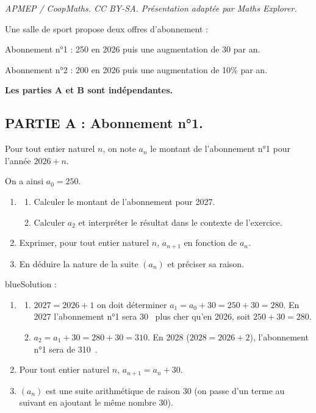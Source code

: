 \documentclass[10pt]{article}
\providecommand{\euro}{\texteuro}
\providecommand{\euro}{{\text{€}}}
\renewcommand{\euro}{\ifmmode\text{\texteuro}\else\texteuro\fi}
\begin{document}
\noindent\textit{APMEP / CoopMaths. CC BY-SA. Présentation adaptée par Maths Explorer.}\par\medskip
Une salle de sport propose deux offres d'abonnement :

Abonnement n°1 : 250 \euro{} en 2026 puis une augmentation de 30 \euro{} par an.

Abonnement n°2 : 200 \euro{} en 2026 puis une augmentation de 10\% par an.

\textbf{Les parties A et B sont indépendantes.}


\subsection*{PARTIE A : Abonnement n°1.}

Pour tout entier naturel $n$, on note $a_n$ le montant de l'abonnement n°1 pour l'année $2026+n$.

On a ainsi $a_0=250$.
\begin{enumerate}
\item
\begin{enumerate}[label=\alph*)]
\item Calculer le montant de l'abonnement pour 2027.
\item Calculer $a_2$ et interpréter le résultat dans le contexte de l'exercice.
\end{enumerate}
\item Exprimer, pour tout entier naturel $n$, $a_{n+1}$ en fonction de $a_n$.
\item En déduire la nature de la suite $(a_n)$ et 
préciser sa raison.
\end{enumerate}

\begin{color}{blue}Solution :\par
\begin{enumerate}
\item
\begin{enumerate}[label=\alph*)]
\item $2027=2026+1$ on doit déterminer $a_{1}=a_{0} + 30 = 250 + 30 = 280$. En 2027 l'abonnement n°1 sera 30~\euro{} plus cher qu'en 2026, soit $250+30=280$.
\item $a_{2}=a_{1} + 30 = 280 + 30 = 310$. En 2028 ($2028=2026+2$), l'abonnement n°1 sera de 310~\euro{}.

\end{enumerate}
\item Pour tout entier naturel $n$, $a_{n+1} = a_n + 30 $.
\item $(a_n)$ est une suite arithmétique de raison 30 (on passe d'un terme au suivant en ajoutant le même nombre 30).
\end{enumerate}
\end{color}
\end{document}
